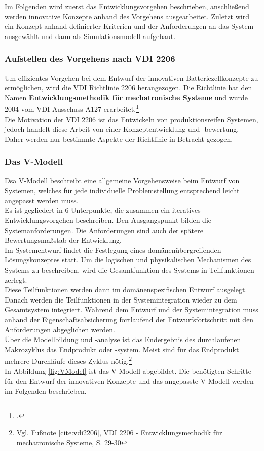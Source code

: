 Im Folgenden wird zuerst das Entwicklungsvorgehen beschrieben, anschließend werden innovative Konzepte anhand des Vorgehens ausgearbeitet. Zuletzt wird ein Konzept anhand definierter Kriterien und der Anforderungen an das System ausgewählt und dann als Simulationsmodell aufgebaut.

\subsubsection{Aufstellen des Vorgehens nach VDI 2206}\label{subsub:vorgehennachVDI}

Um effizientes Vorgehen bei dem Entwurf der innovativen Batteriezellkonzepte zu ermöglichen, wird die VDI Richtlinie 2206 herangezogen. Die Richtlinie hat den Namen \textbf{Entwicklungsmethodik für mechatronische Systeme} und wurde 2004 vom VDI-Ausschuss A127 erarbeitet.\footcite[Vgl.\label{cite:vdi2206}][S. 3]{VDI2206.June2004}\\
Die Motivation der VDI 2206 ist das Entwickeln von produktionsreifen Systemen, jedoch handelt diese Arbeit von einer Konzeptentwicklung und -bewertung. Daher werden nur bestimmte Aspekte der Richtlinie in Betracht gezogen.\\

\subsubsection*{Das V-Modell}

Dsa V-Modell beschreibt eine allgemeine Vorgehensweise beim Entwurf von Systemen, welches für jede individuelle Problemstellung entsprechend leicht angepasst werden muss.\\
Es ist gegliedert in 6 Unterpunkte, die zusammen ein iteratives Entwicklungsvorgehen beschreiben. Den Ausgangspunkt bilden die Systemanforderungen. Die Anforderungen sind auch der spätere Bewertungsmaßstab der Entwicklung.\\
Im Systementwurf findet die Festlegung eines domänenübergreifenden Lösungskonzeptes statt. Um die logischen und physikalischen Mechanismen des Systems zu beschreiben, wird die Gesamtfunktion des Systems in Teilfunktionen zerlegt.\\
Diese Teilfunktionen werden dann im domänenspezifischen Entwurf ausgelegt. Danach werden die Teilfunktionen in der Systemintegration wieder zu dem Gesamtsystem integriert. Während dem Entwurf und der Systemintegration muss anhand der Eigenschaftsabsicherung fortlaufend der Entwurfsfortschritt mit den Anforderungen abgeglichen werden.\\
Über die Modellbildung und -analyse ist das Endergebnis des durchlaufenen Makrozyklus das Endprodukt oder -system. Meist sind für das Endprodukt mehrere Durchläufe dieses Zyklus nötig.\footnote{Vgl. Fußnote \ref{cite:vdi2206}, VDI 2206 - Entwicklungsmethodik für mechatronische Systeme, S. 29-30}\\
In Abbildung \ref{fig:VModel} ist das V-Modell abgebildet. Die benötigten Schritte für den Entwurf der innovativen Konzepte und das angepasste V-Modell werden im Folgenden beschrieben.

